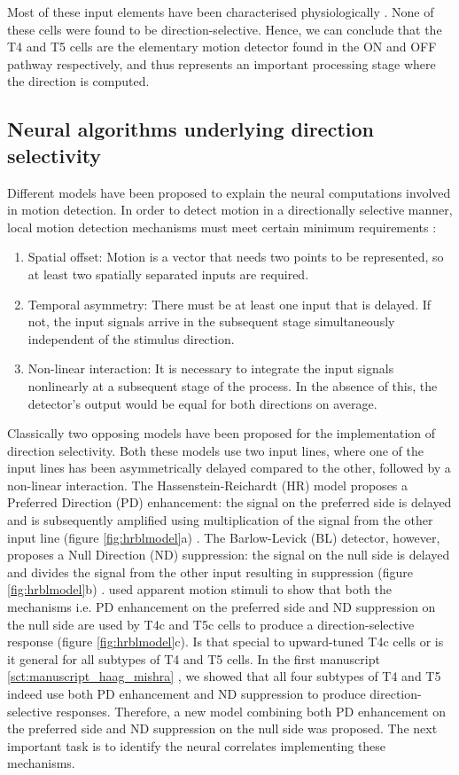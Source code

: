 Most of these input elements have been characterised physiologically \parencite{Arenz2017, Serbe2016, Strother2017, Meier2019, Behnia2014, Groschner2022}. None of these cells were found to be direction-selective. Hence, we can conclude that the T4 and T5 cells are the elementary motion detector found in the ON and OFF pathway respectively, and thus represents an important processing stage where the direction is computed.    

\subsection{Neural algorithms underlying direction selectivity}
Different models have been proposed to explain the neural computations involved in motion detection. In order to detect motion in a directionally selective manner, local motion detection mechanisms must meet certain minimum requirements \parencite{Borst1989}:
\begin{enumerate}
\item Spatial offset: Motion is a vector that needs two points to be represented, so at least two spatially separated inputs are required.
\item Temporal asymmetry: There must be at least one input that is delayed. If not, the input signals arrive in the subsequent stage simultaneously independent of the stimulus direction.
\item Non-linear interaction: It is necessary to integrate the input signals nonlinearly at a subsequent stage of the process. In the absence of this, the detector's output would be equal for both directions on average.
\end{enumerate} 

Classically two opposing models have been proposed for the implementation of direction selectivity. Both these models use two input lines, where one of the input lines has been asymmetrically delayed compared to the other, followed by a non-linear interaction. The Hassenstein-Reichardt (HR) model proposes a Preferred Direction (PD) enhancement: the signal on the preferred side is delayed and is subsequently amplified using multiplication of the signal from the other input line (figure \ref{fig:hrblmodel}a) \parencite{Hassenstein1956}. The Barlow-Levick (BL) detector, however, proposes a Null Direction (ND) suppression: the signal on the null side is delayed and divides the signal from the other input resulting in suppression (figure \ref{fig:hrblmodel}b) \parencite{Barlow1965}. \cite{Haag2016} used apparent motion stimuli to show that both the mechanisms i.e. PD enhancement on the preferred side and ND suppression on the null side are used by T4c and T5c cells to produce a direction-selective response (figure \ref{fig:hrblmodel}c). Is that special to upward-tuned T4c cells or is it general for all subtypes of T4 and T5 cells. In the first manuscript \ref{sct:manuscript_haag_mishra} \parencite{Haag2017}, we showed that all four subtypes of T4 and T5 indeed use both PD enhancement and ND suppression to produce direction-selective responses. Therefore, a new model combining both PD enhancement on the preferred side and ND suppression on the null side was proposed. The next important task is to identify the neural correlates implementing these mechanisms. 

